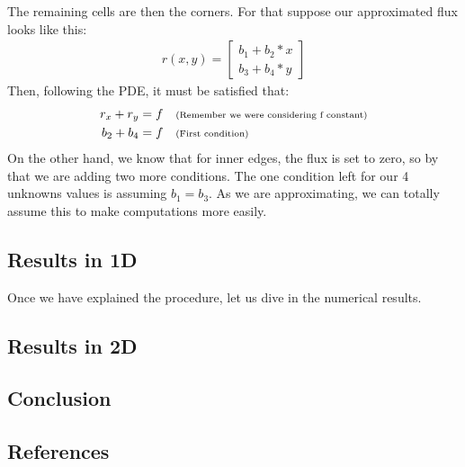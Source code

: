\documentclass{article}
\begin{document}
    The remaining cells are then the corners. For that suppose our approximated flux looks like this:
    \begin{align*}
        r(x,y) = \begin{bmatrix}
            b_1+b_2*x\\
            b_3+b_4*y
            \end{bmatrix}
    \end{align*}
    Then, following the PDE, it must be satisfied that:
    \begin{align*}
        r_x + r_y &= f \quad \text{\scriptsize{(Remember we were considering f constant)}}\\
        b_2 + b_4 &= f \quad \text{\scriptsize{(First condition)}}
    \end{align*}
    On the other hand, we know that for inner edges, the flux is set to zero, so by that we are adding two more conditions. The one condition left for our 4 unknowns values is assuming $b_1 = b_3$. As we are approximating, we can totally assume this to make computations more easily. 

    \subsection*{Results in 1D}
    Once we have explained the procedure, let us dive in the numerical results.

    \subsection*{Results in 2D}

    \subsection*{Conclusion}
    \subsection*{References}
\end{document}
